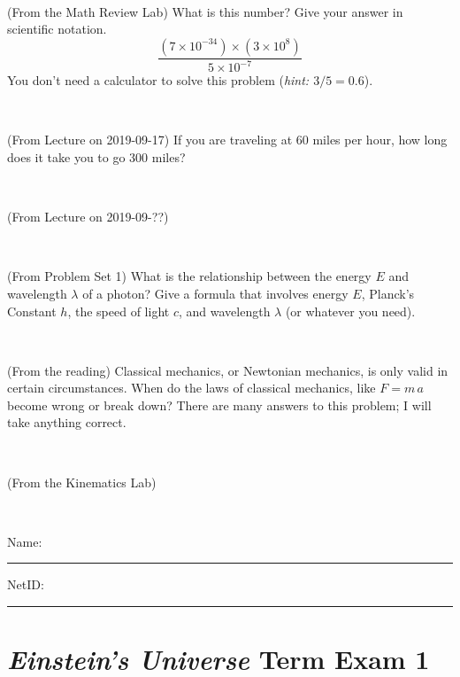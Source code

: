 \documentclass[12pt, letterpaper]{article}
\begin{document}
\vfill ~

\begin{problem} (From the Math Review Lab)
What is this number? Give your answer in scientific notation.
$$
\frac{(7\times10^{-34})\times(3\times10^8)}{5\times10^{-7}}
$$
You don't need a calculator to solve this problem (\textit{hint: $3/5=0.6$}).
\end{problem}


\vfill ~

\begin{problem} (From Lecture on 2019-09-17)
If you are traveling at 60 miles per hour, how long does
it take you to go 300 miles?
\end{problem}


\vfill ~


\clearpage


\begin{problem} (From Lecture on 2019-09-??)
\end{problem}


\vfill ~

\begin{problem} (From Problem Set 1)
What is the relationship between the energy $E$ and wavelength
$\lambda$ of a photon? Give a formula that involves energy $E$,
Planck's Constant $h$, the speed of light $c$, and wavelength
$\lambda$ (or whatever you need).
\end{problem}

\vfill ~

\begin{problem} (From the reading)
Classical mechanics, or Newtonian mechanics, is only valid in certain
circumstances. When do the laws of classical mechanics, like $F =
m\,a$ become wrong or break down? There are many answers to this
problem; I will take anything correct.
\end{problem}


\vfill ~

\begin{problem} (From the Kinematics Lab)

\end{problem}


\vfill ~


\cleardoublepage



\noindent
Name: \rule[-1ex]{0.60\textwidth}{0.1pt}
NetID: \rule[-1ex]{0.20\textwidth}{0.1pt}

\section*{\textsl{Einstein's Universe} Term Exam 1}
\setcounter{problem}{1}
\end{document}
